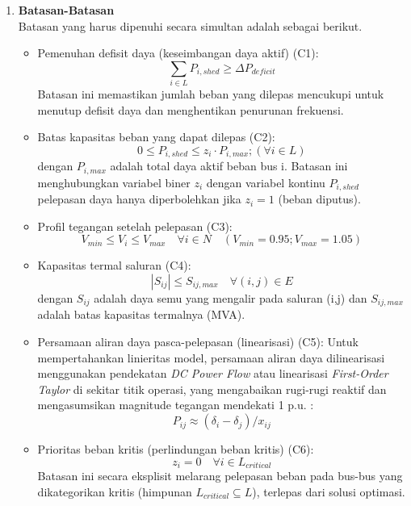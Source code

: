 \begin{enumerate}
\item[c.]{\textbf{Batasan-Batasan}}\\
Batasan yang harus dipenuhi secara simultan adalah sebagai berikut.
\begin{itemize}
\item[i.] Pemenuhan defisit daya (keseimbangan daya aktif) (C1):
\begin{equation}
    \sum_{i\in L}P_{i,shed}\ge\Delta P_{deficit}
\end{equation}
Batasan ini memastikan jumlah beban yang dilepas mencukupi untuk menutup defisit daya dan menghentikan penurunan frekuensi.

\item[ii.] Batas kapasitas beban yang dapat dilepas (C2):
\begin{equation}
    0\le P_{i,shed}\le z_{i}\cdot P_{i,max}; (\forall i\in L)
\end{equation}
dengan $P_{i,max}$ adalah total daya aktif beban bus i. Batasan ini menghubungkan variabel biner $z_{i}$ dengan variabel kontinu $P_{i,shed}$ pelepasan daya hanya diperbolehkan jika $z_{i}=1$ (beban diputus).

\item[iii.] Profil tegangan setelah pelepasan (C3):
\begin{equation}
    V_{min}\le V_{i}\le V_{max} \quad \forall i\in N \quad (V_{min}=0.95; V_{max}=1.05)
\end{equation}

\item[iv.] Kapasitas termal saluran (C4):
\begin{equation}
    |S_{ij}|\le S_{ij,max} \quad \forall(i,j)\in E
\end{equation}
dengan $S_{ij}$ adalah daya semu yang mengalir pada saluran (i,j) dan $S_{ij,max}$ adalah batas kapasitas termalnya (MVA).

\item[v.] Persamaan aliran daya pasca-pelepasan (linearisasi) (C5):
Untuk mempertahankan linieritas model, persamaan aliran daya dilinearisasi menggunakan pendekatan \textit{DC Power Flow} atau linearisasi \textit{First-Order Taylor} di sekitar titik operasi, yang mengabaikan rugi-rugi reaktif dan mengasumsikan magnitude tegangan mendekati 1 p.u. \cite{Farivar2013}:
\begin{equation}
    P_{ij}\approx(\delta_{i}-\delta_{j})/x_{ij}
\end{equation}

\item[vi.] Prioritas beban kritis (perlindungan beban kritis) (C6):
\begin{equation}
    z_{i}=0 \quad \forall i\in L_{critical}
\end{equation}
Batasan ini secara eksplisit melarang pelepasan beban pada bus-bus yang dikategorikan kritis (himpunan $L_{critical}\subseteq L$), terlepas dari solusi optimasi.
\end{itemize}
\end{enumerate}


